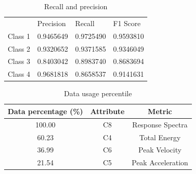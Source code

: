 \begin{table}
\centering
\caption{Recall and precision}
\begin{tabular}{llll}
\hline
        & Precision & Recall  & F1 Score \\ \cline{2-4} 
Class 1 & 0.9465649 &  0.9725490 &  0.9593810 \\
Class 2 & 0.9320652 &  0.9371585 &  0.9346049 \\
Class 3 & 0.8403042 &  0.8983740 &  0.8683694 \\
Class 4 & 0.9681818 &  0.8658537 &  0.9141631 \\ \hline
\end{tabular}
\label{tab:prec_recall_test_2}
\end{table}







\begin{table}
\centering
\caption{Data usage percentile}
\begin{tabular}{ccc}
\hline
Data percentage (\%) & Attribute & Metric                \\ \hline
100.00                 & C8        & Response Spectra      \\
60.23                   & C4        & Total Energy                \\ 
36.99                   & C6        & Peak Velocity      \\
21.54                   & C5        & Peak Acceleration      \\ \hline
\end{tabular}
\label{tab:attribute_usage_2}
\end{table}







                                          
                                          


